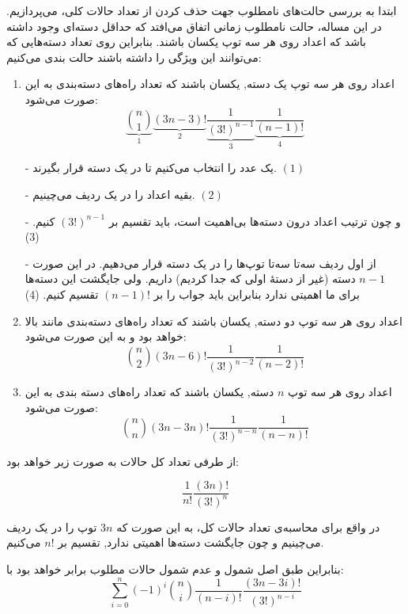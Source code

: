     \p
    ابتدا به بررسی حالت‌های نامطلوب جهت حذف کردن از تعداد حالات کلی، می‌پردازیم. در این مساله، حالت نامطلوب زمانی اتفاق می‌افتد که حداقل دسته‌ای وجود داشته باشد که اعداد روی هر سه توپ یکسان باشند. بنابراین روی تعداد دسته‌هایی که می‌توانند این ویژگی را داشته باشند حالت بندی می‌کنیم:
	\begin{enumerate}
	    \item 
    	اعداد روی هر سه توپ یک دسته, یکسان باشند که تعداد راه‌های دسته‌بندی به این صورت می‌شود:
    	$$\underbrace{{n  \choose 1}}_1\underbrace{(3n - 3)!}_2\underbrace{\frac{1}{(3!)^{n - 1}}}_3 \underbrace{\frac{1}{(n - 1)!}}_4$$
    	
    	- یک عدد را انتخاب می‌کنیم تا در یک دسته قرار بگیرند.
    	$(1)$
    	
    	- بقیه اعداد را در یک ردیف می‌چینیم.
    	$(2)$
    	
    	- و چون ترتیب اعداد درون دسته‌ها بی‌اهمیت است، باید تقسیم بر $(3!)^{n-1}$ کنیم.
    	(3)
    	
    	- از اول ردیف سه‌تا سه‌تا توپ‌ها را در یک دسته قرار می‌دهیم. در این صورت $n - 1$ دسته (غیر از دستهٔ اولی که جدا کردیم) داریم. ولی جایگشت این دسته‌ها برای ما اهمیتی ندارد بنابراین باید جواب را بر $(n-1)!$ تقسیم کنیم.
    	(4)
    	\item
    	اعداد روی هر سه توپ دو دسته, یکسان باشند که تعداد راه‌های دسته‌بندی مانند بالا خواهد بود و به این صورت می‌شود:
    	$${n  \choose 2}(3n - 6)! \frac{1}{(3!)^{n - 2}} \frac{1}{(n - 2)!}$$
    	\item
    	اعداد روی هر سه توپ $n$ دسته, یکسان باشند که تعداد راه‌های دسته بندی به این صورت می‌شود:
    	$${n \choose n}(3n - 3n)! \frac{1}{(3!)^{n - n}} \frac{1}{(n - n)!}$$
	\end{enumerate}
    \p
	از طرفی تعداد کل حالات به صورت زیر خواهد بود:
	
	$$\frac{1}{n!} \frac{(3n)!}{(3!)^n}$$
	
	در واقع برای محاسبه‌ی تعداد حالات کل، به این صورت که $3n$ توپ را در یک ردیف می‌چینیم و چون جایگشت دسته‌ها اهمیتی ندارد, تقسیم بر $n!$ می‌کنیم.
	
    \p
	بنابراین طبق اصل شمول و عدم شمول حالات مطلوب برابر خواهد بود با:
	$$\sum\limits_{i = 0}^n (-1)^i {n \choose i} \frac{1}{(n - i)!} \frac{(3n - 3i)!}{(3!)^{n - i}}$$
